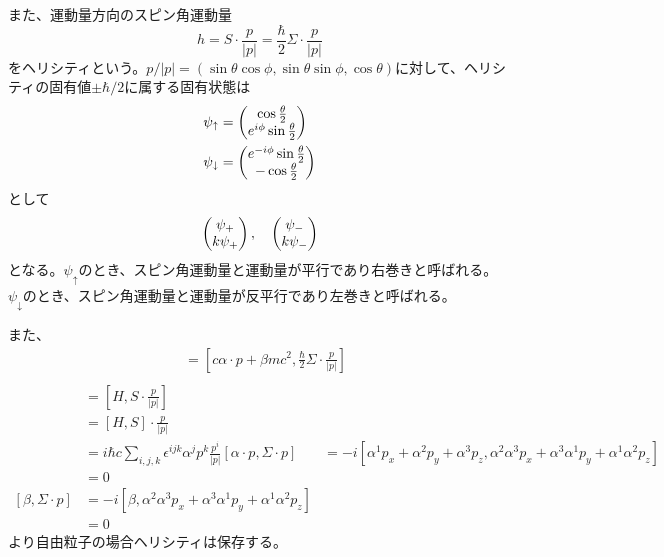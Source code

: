 
    また、運動量方向のスピン角運動量
        \[h = S \cdot \frac{p}{|p|} = \frac{\hbar}{2}\Sigma \cdot \frac{p}{|p|}\]
    をヘリシティという。$p/|p| = (\sin\theta\cos\phi, \sin\theta\sin\phi, \cos\theta)$に対して、ヘリシティの固有値$\pm \hbar/2$に属する固有状態は
    \begin{align*}
        \psi_\uparrow &= \begin{pmatrix} \cos\frac{\theta}{2}\\ e^{i\phi}\sin\frac{\theta}{2} \end{pmatrix}\\
        \psi_\downarrow &= \begin{pmatrix} e^{-i\phi}\sin\frac{\theta}{2}\\ -\cos\frac{\theta}{2} \end{pmatrix}
    \end{align*}
    として
    \begin{align*}
        \begin{pmatrix} \psi_+\\ k\psi_+ \end{pmatrix}, \quad \begin{pmatrix} \psi_-\\ k\psi_- \end{pmatrix}
    \end{align*}
    となる。$\psi_\uparrow$のとき、スピン角運動量と運動量が平行であり右巻きと呼ばれる。$\psi_\downarrow$のとき、スピン角運動量と運動量が反平行であり左巻きと呼ばれる。

    また、
    \begin{align*}
        [H, h]
            &= \left[c\alpha \cdot p + \beta mc^2, \frac{\hbar}{2}\Sigma \cdot \frac{p}{|p|}\right]\\
    \end{align*}
    \begin{align*}
        [H, h]
            &= \left[H, S \cdot \frac{p}{|p|}\right]\\
            &= [H, S] \cdot \frac{p}{|p|}\\
            &= i\hbar c \sum_{i,j,k} \epsilon^{ijk}\alpha^jp^k\frac{p^i}{|p|}
        [\alpha \cdot p, \Sigma \cdot p]
            &= -i[\alpha^1p_x + \alpha^2p_y + \alpha^3p_z, \alpha^2\alpha^3p_x + \alpha^3\alpha^1p_y + \alpha^1\alpha^2p_z]\\
            &= 0\\
        [\beta, \Sigma \cdot p]
            &= -i[\beta, \alpha^2\alpha^3p_x + \alpha^3\alpha^1p_y + \alpha^1\alpha^2p_z]\\
            &= 0
    \end{align*}
    より自由粒子の場合ヘリシティは保存する。

